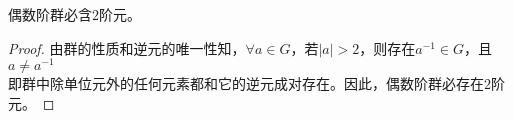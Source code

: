 \begin{proposition}

    偶数阶群必含$2$阶元。

\end{proposition}

\begin{proof}

    由群的性质和逆元的唯一性知，$\forall a \in G$，若$|a| > 2$，则存在$a^{-1} \in G$，且$a \neq a^{-1}$\\
    即群中除单位元外的任何元素都和它的逆元成对存在。因此，偶数阶群必存在$2$阶元。

\end{proof}
